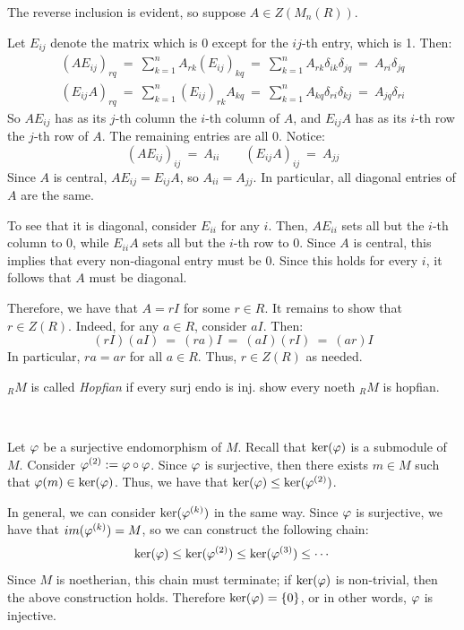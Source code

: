\begin{pf}
	The reverse inclusion is evident, so suppose $A\in Z(M_{n}(R))$.

	Let $E_{ij}$ denote the matrix which is 0 except for the $ij$-th entry,
	which is 1. Then:
	\begin{gather*}
		(AE_{ij})_{rq} \ = \ \sum_{k=1}^{n}A_{rk}(E_{ij})_{kq}
		\ = \ \sum_{k=1}^{n}A_{rk}\delta_{ik}\delta_{jq}
		\ = \ A_{ri}\delta_{jq} \\
		(E_{ij}A)_{rq} \ = \ \sum_{k=1}^{n}(E_{ij})_{rk}A_{kq}
		\ = \ \sum_{k=1}^{n}A_{kq}\delta_{ri}\delta_{kj}
		\ = \ A_{jq}\delta_{ri}
	\end{gather*}
	So $AE_{ij}$ has as its $j$-th column the $i$-th column of $A$, and
	$E_{ij}A$ has as its $i$-th row the $j$-th row of $A$.
	The remaining entries are all 0. Notice:
	\begin{equation*}
		(AE_{ij})_{ij} \ = \ A_{ii} \qquad
		(E_{ij}A)_{ij} \ = \ A_{jj}
	\end{equation*}
	Since $A$ is central, $AE_{ij}=E_{ij}A$, so $A_{ii}=A_{jj}$.
	In particular, all diagonal entries of $A$ are the same.

	To see that it is diagonal, consider $E_{ii}$ for any $i$.
	Then, $AE_{ii}$ sets all but the $i$-th column to 0,
	while $E_{ii}A$ sets all but the $i$-th row to 0.
	Since $A$ is central, this implies that every non-diagonal entry must be 0.
	Since this holds for every $i$, it follows that $A$ must be diagonal.

	Therefore, we have that $A=rI$ for some $r\in R$.
	It remains to show that $r\in Z(R)$.
	Indeed, for any $a\in R$, consider $aI$. Then:
	\begin{equation*}
		(rI)(aI) \ = \ (ra)I \ = \ (aI)(rI) \ = \ (ar)I
	\end{equation*}
	In particular, $ra=ar$ for all $a\in R$.
	Thus, $r\in Z(R)$ as needed.
\end{pf}


\nq
\begin{exr}[title=Exercise 1.12 part a)]
    $_{R}M$ is called \textit{Hopfian} if every surj endo is inj.
	show every noeth $_{R}M$ is hopfian.
\end{exr} \

\begin{pf}
	Let $\varphi$ be a surjective endomorphism of $M$.
	Recall that $\ker(\varphi)$ is a submodule of $M$.
	Consider $\varphi^{(2)}:=\varphi\circ\varphi$.
	Since $\varphi$ is surjective, then there exists $m \in M$ such that
	$\varphi(m)\in\ker(\varphi)$.
	Thus, we have that $\ker(\varphi)\leq\ker(\varphi^{(2)})$.

	In general, we can consider $\ker(\varphi^{(k)})$ in the same way.
	Since $\varphi$ is surjective, we have that $im(\varphi^{(k)})=M$,
	so we can construct the following chain:
	\begin{equation*}
	    \ker(\varphi) \leq \ker(\varphi^{(2)}) \leq \ker(\varphi^{(3)}) \leq \cdots
	\end{equation*}
	Since $M$ is noetherian, this chain must terminate;
	if $\ker(\varphi)$ is non-trivial, then the above construction holds.
	Therefore $\ker(\varphi)=\left\{{0}\right\}$, or in other words, $\varphi$ is injective.
\end{pf} \

